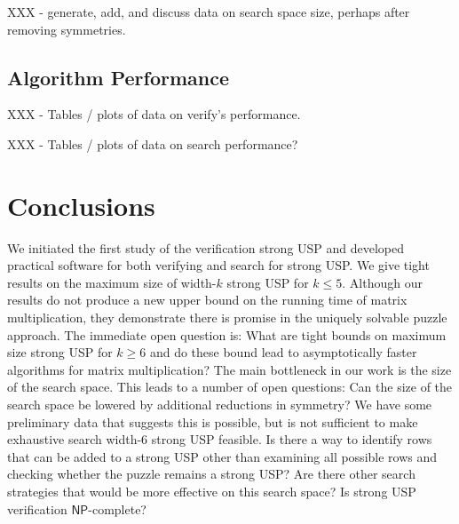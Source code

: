 \documentclass[11pt]{article}
\renewcommand\NP{\ensuremath{\mathsf{NP}}}
\begin{document}
XXX - generate, add, and discuss data on search space size, perhaps
after removing symmetries.


\subsection{Algorithm Performance}
\label{subsec:performance}

XXX - Tables / plots of data on verify's performance.

XXX - Tables / plots of data on search performance?

\section{Conclusions}
\label{sec:conclusion}

We initiated the first study of the verification strong USP and
developed practical software for both verifying and search for strong
USP.  We give tight results on the maximum size of width-$k$ strong
USP for $k \le 5$.  Although our results do not produce a new upper
bound on the running time of matrix multiplication, they demonstrate
there is promise in the uniquely solvable puzzle approach.  The
immediate open question is: What are tight bounds on maximum size
strong USP for $k \ge 6$ and do these bound lead to asymptotically
faster algorithms for matrix multiplication?  The main bottleneck in
our work is the size of the search space.  This leads to a number of
open questions: Can the size of the search space be lowered by
additional reductions in symmetry?  We have some preliminary data that
suggests this is possible, but is not sufficient to make exhaustive
search width-6 strong USP feasible.  Is there a way to identify rows
that can be added to a strong USP other than examining all possible
rows and checking whether the puzzle remains a strong USP?  Are there
other search strategies that would be more effective on this search
space?  Is strong USP verification \NP-complete?

 

\appendix
\end{document}
